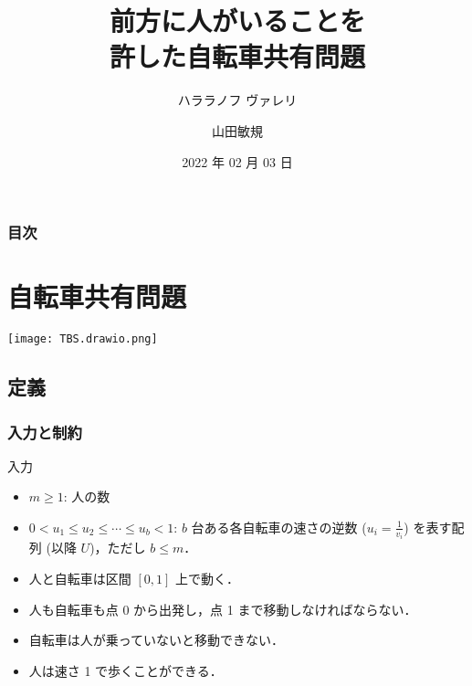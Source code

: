 \documentclass[dvipdfmx,12pt]{beamer}
\title{前方に人がいることを\\許した自転車共有問題}
\author[ハララノフ \and 山田]{ハララノフ ヴァレリ \inst{1} \and 山田敏規 \inst{2}}
\institute[shortinst]{\inst{1} 埼玉大学工学部情報工学科 \and %
                      \inst{2} 埼玉大学大学院理工学研究科数理電子情報部門}
\date{2022 年 02 月 03 日}
\newcommand{\definedas}{:}
\begin{document}
\begin{frame}
  \maketitle
\end{frame}

\begin{frame}
  \frametitle{目次}
  \tableofcontents
\end{frame}

\section{自転車共有問題}
\begin{frame}
  \centering\texttt{[image: TBS.drawio.png]}
\end{frame}

\subsection{定義}
\begin{frame}
  \frametitle{入力と制約}
  \begin{block}{入力}
    \begin{itemize}
    \item $m \geq 1$\definedas{} 人の数
    \item $0 < u_1 \leq u_2 \leq \cdots \leq u_b < 1 $\definedas{} $b$ 台ある各自転車の速さの逆数 ($u_i = \frac{1}{v_i}$) を表す配列 (以降 $U$)，ただし $b \leq m$．
    \end{itemize}
  \end{block}
  \begin{itemize}
  \item 人と自転車は区間 $[0, 1]$ 上で動く．
  \item 人も自転車も点 0 から出発し，点 1 まで移動\linebreak しなければならない．
  \item 自転車は人が乗っていないと移動できない．
  \item 人は速さ 1 で歩くことができる．
  \end{itemize}
\end{frame}
\end{document}
